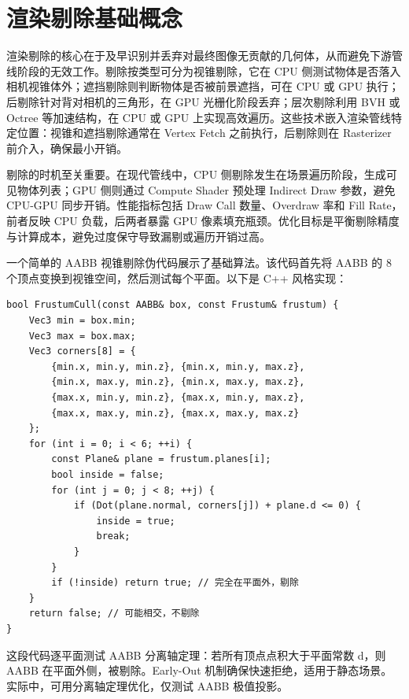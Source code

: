 \chapter{渲染剔除基础概念}
渲染剔除的核心在于及早识别并丢弃对最终图像无贡献的几何体，从而避免下游管线阶段的无效工作。剔除按类型可分为视锥剔除，它在 CPU 侧测试物体是否落入相机视锥体外；遮挡剔除则判断物体是否被前景遮挡，可在 CPU 或 GPU 执行；后剔除针对背对相机的三角形，在 GPU 光栅化阶段丢弃；层次剔除利用 BVH 或 Octree 等加速结构，在 CPU 或 GPU 上实现高效遍历。这些技术嵌入渲染管线特定位置：视锥和遮挡剔除通常在 Vertex Fetch 之前执行，后剔除则在 Rasterizer 前介入，确保最小开销。\par
剔除的时机至关重要。在现代管线中，CPU 侧剔除发生在场景遍历阶段，生成可见物体列表；GPU 侧则通过 Compute Shader 预处理 Indirect Draw 参数，避免 CPU-GPU 同步开销。性能指标包括 Draw Call 数量、Overdraw 率和 Fill Rate，前者反映 CPU 负载，后两者暴露 GPU 像素填充瓶颈。优化目标是平衡剔除精度与计算成本，避免过度保守导致漏剔或遍历开销过高。\par
一个简单的 AABB 视锥剔除伪代码展示了基础算法。该代码首先将 AABB 的 8 个顶点变换到视锥空间，然后测试每个平面。以下是 C++ 风格实现：\par
\begin{lstlisting}
bool FrustumCull(const AABB& box, const Frustum& frustum) {
    Vec3 min = box.min;
    Vec3 max = box.max;
    Vec3 corners[8] = {
        {min.x, min.y, min.z}, {min.x, min.y, max.z},
        {min.x, max.y, min.z}, {min.x, max.y, max.z},
        {max.x, min.y, min.z}, {max.x, min.y, max.z},
        {max.x, max.y, min.z}, {max.x, max.y, max.z}
    };
    for (int i = 0; i < 6; ++i) {
        const Plane& plane = frustum.planes[i];
        bool inside = false;
        for (int j = 0; j < 8; ++j) {
            if (Dot(plane.normal, corners[j]) + plane.d <= 0) {
                inside = true;
                break;
            }
        }
        if (!inside) return true; // 完全在平面外，剔除
    }
    return false; // 可能相交，不剔除
}
\end{lstlisting}
这段代码逐平面测试 AABB 分离轴定理：若所有顶点点积大于平面常数 d，则 AABB 在平面外侧，被剔除。Early-Out 机制确保快速拒绝，适用于静态场景。实际中，可用分离轴定理优化，仅测试 AABB 极值投影。\par
